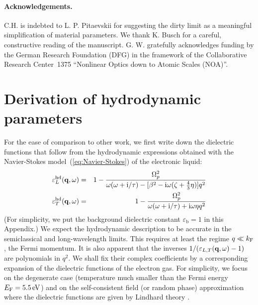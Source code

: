 \documentclass[11pt, oneside]{article}   	%
\newcommand{\bulk}[1]{_{\mathrm{#1}}}
\def\OmegaP{\Omega_{p}}
\begin{document}
\vspace{6pt} 


\paragraph{Acknowledgements.}
C.H. is indebted to L. P. Pitaevskii for suggesting the dirty limit as a meaningful
simplification of material parameters. 
We thank K. Busch for a careful, constructive reading of the manuscript.
G. W. gratefully acknowledges funding by the German Research Foundation (DFG) in
the framework of the Collaborative Research Center~1375 ``Nonlinear Optics down to Atomic Scales (NOA)''.



\appendix

\section{Derivation of hydrodynamic parameters}
\label{a:Lindhard-Conti}

For the ease of comparison to other work, we first write down the dielectric functions
that follow from the hydrodynamic expressions obtained 
with the Navier-Stokes model~(\ref{eq:Navier-Stokes}) of the electronic liquid:
\begin{eqnarray}
\varepsilon^{\rm hd}_{L}({\bf q}, \omega) &=& 1 - \frac{\OmegaP^2}{\omega(\omega + {\rm i} /\tau) - [{\beta}^2 - {\rm i} \omega (\zeta + \tfrac43\eta) ] q^2}
\label{eq:appendix_longitudinal_hd_epsilon} \\
\varepsilon^{\rm hd}_{T}({\bf q}, \omega) & =& 1 - \frac{\OmegaP^2}{\omega(\omega + {\rm i} /\tau) + {\rm i} \omega {\eta} q^2}
\label{eq:appendix_transverse_hd_epsilon}
\end{eqnarray}
(For simplicity, we put the background dielectric constant $\varepsilon\bulk{b} = 1$ in this 
Appendix.)
We expect the hydrodynamic description to be accurate in the semiclassical and long-wavelength
limits. This requires at least the regime $q \ll k_{\rm F}$, the Fermi momentum. It is also
apparent that the inverses $1 / ( \varepsilon_{L,T}( {\bf q}, \omega) - 1)$ are polynomials
in $q^2$. We shall fix their complex coefficients by a corresponding expansion of the 
dielectric functions of the electron gas. For simplicity, we focus on the degenerate case
(temperature much smaller than the Fermi energy $E_{\rm F} = 5.5\,{\rm eV}$) 
and on the self-consistent field (or random phase)
approximation where the dielectric functions are given by Lindhard theory
\citep{DresselGruenerBook, Lindhard_1954}. 
\end{document}
